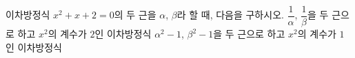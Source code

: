 이차방정식 $x^2+x+2=0$의 두 근을 $\alpha$, $\beta$라 할 때, 다음을 구하시오.
 $\dfrac{1}{\alpha}$, $\dfrac{1}{\beta}$을 두 근으로 하고 $x^2$의 계수가 $2$인 이차방정식
 $\alpha^2-1$, $\beta^2-1$을 두 근으로 하고 $x^2$의 계수가 $1$인 이차방정식
